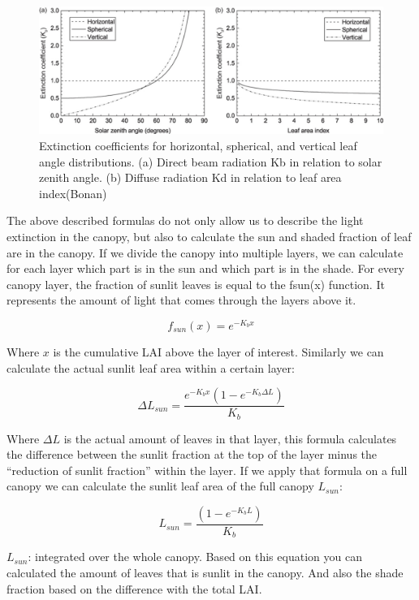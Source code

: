 \documentclass[
  12pt,
  oneside]{book}
\begin{document}
\begin{figure}

{\centering \includegraphics[width=0.8\linewidth]{figures/chap3/f312_Kb_angle} 

}

\caption{Extinction coefficients for horizontal, spherical, and vertical leaf angle distributions. (a) Direct beam radiation Kb in relation to solar zenith angle. (b) Diffuse radiation Kd in relation to leaf area index(Bonan)}\label{fig:f312}
\end{figure}

The above described formulas do not only allow us to describe the light extinction in the canopy, but also to calculate the sun and shaded fraction of leaf are in the canopy. If we divide the canopy into multiple layers, we can calculate for each layer which part is in the sun and which part is in the shade. For every canopy layer, the fraction of sunlit leaves is equal to the fsun(x) function. It represents the amount of light that comes through the layers above it.

\[
f_{sun} (x) = e^{-K_b x}
\]

Where \(x\) is the cumulative LAI above the layer of interest. Similarly we can calculate the actual sunlit leaf area within a certain layer:

\[
\Delta L_{sun} = \frac{e^{-K_b x} \left(1 - e^{-K_b \Delta L} \right)}{K_b}
\]

Where \(\Delta L\) is the actual amount of leaves in that layer, this formula calculates the difference between the sunlit fraction at the top of the layer minus the ``reduction of sunlit fraction'' within the layer. If we apply that formula on a full canopy we can calculate the sunlit leaf area of the full canopy \(L_{sun}\):

\[
L_{sun} = \frac{\left(1 - e^{-K_b L} \right)}{K_b}
\]

\(L_{sun}\): integrated over the whole canopy. Based on this equation you can calculated the amount of leaves that is sunlit in the canopy. And also the shade fraction based on the difference with the total LAI.
\end{document}
